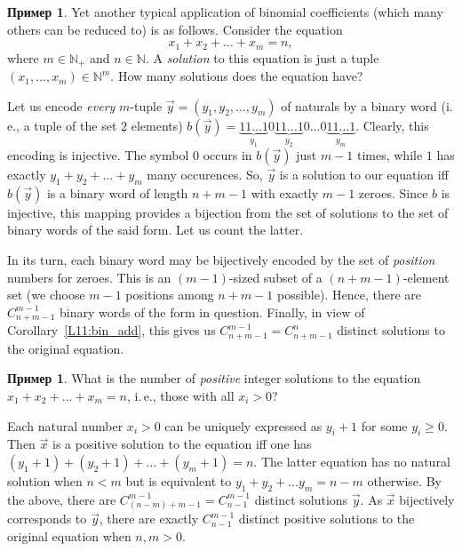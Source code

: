 \documentclass[12pt,notitlepage]{article}
\theoremstyle{plain}
\theoremstyle{definition}
\newtheorem{exm}[thm]{Пример}
\theoremstyle{plain}
\newcommand{\N}{\mathbb{N}}
\newcommand{\ul}[1]{\underline{#1}}
\newcommand{\1}{\mathbf{1}}
\newcommand{\0}{\mathbf{0}}
\newcommand{\mcomm}[1]{}
\begin{document}
\begin{exm}
	Yet another typical application of binomial coefficients (which many others can be reduced to) is as follows. Consider the equation
	$$x_1 + x_2 + \ldots + x_m = n,$$
	where $m \in \N_+$ and $n \in \N$. A \emph{solution} to this equation is just a tuple $(x_1,\ldots, x_m) \in \N^m$. How many solutions does the equation have?
	
	Let us encode \emph{every} $m$-tuple $\vec y = (y_1, y_2, \ldots,y_m)$ of naturals by a binary word (i.\,e., a tuple of the set $\ul{2}$ elements) $b(\vec y) = \underbrace{11\ldots1}_{y_1}0\underbrace{11\ldots1}_{y_2}0\ldots 0 \underbrace{11\ldots1}_{y_m}$. Clearly, this encoding is injective. The symbol $0$ occurs in $b(\vec y)$ just $m - 1$ times, while $1$ has exactly $y_1 + y_2 + \ldots + y_m$ many occurences. So, $\vec y$ is a solution to our equation iff $b(\vec y)$ is a binary word of length $n + m - 1$ with exactly $m - 1$ zeroes. Since $b$ is injective, this mapping provides a bijection from the set of solutions to the set of binary words of the said form. Let us count the latter.
	
	In its turn, each binary word may be bijectively encoded by the set of \emph{position} numbers for zeroes. This is an $(m-1)$-sized subset of a $(n + m - 1)$-element set (we choose $m-1$ positions among $n + m -1$ possible). Hence, there are $C_{n + m -1}^{m - 1}$ binary words of the form in question. Finally, in view of Corollary~\ref{L11:bin_add}, this gives us $C_{n + m -1}^{m - 1} = C_{n + m -1}^{n}$ distinct solutions to the original equation.
\end{exm}
\mcomm{It is important to highlight diverse bijections and `encodings' which reduce a problem to formal primitives. For a seminar class, we recommend to make them explicit in a few introductory problems and switch to the traditional ``intuitive'' style afterward (except for the most tricky arguments). Ideally, students should be able to translate intuitive combinatorial proofs into the set-theoretic formalism freely. The fact that most traditional combinatorial problems are stated informally makes this task quite hard.}
\begin{exm}
	What is the number of \emph{positive} integer solutions to the equation $x_1 + x_2 + \ldots + x_m = n$, i.\,e., those with all $x_i > 0$?
	
	Each natural number $x_i > 0$ can be uniquely expressed as $y_i + 1$ for some $y_i \geq 0$. Then $\vec x$ is a positive solution to the equation iff one has $(y_1 + 1) + (y_2 + 1) + \ldots + (y_m + 1) = n$. The latter equation has no natural solution when $n < m$ but is equivalent to $y_1 + y_2 + \ldots y_m = n - m$ otherwise. By the above, there are $C_{(n - m) + m - 1}^{m - 1} = C_{n - 1}^{m - 1}$ distinct solutions $\vec y$. As $\vec x$ bijectively corresponds to $\vec y$, there are exactly $C_{n - 1}^{m - 1}$ distinct positive solutions to the original equation when $n, m > 0$.
\end{exm}
\end{document}
